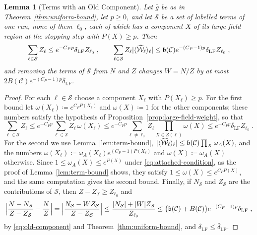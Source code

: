 \documentclass[11pt]{preprint}
\DeclarePairedDelimiter{\abs}{\lvert}{\rvert}
\numberwithin{equation}{section}
\newtheorem{lemma}[theorem]{Lemma}
\theoremstyle{definition}
\theoremstyle{remark}
\theoremstyle{plain}
\begin{document}
\begin{lemma}[Terms with an Old Component]\label{lem:old-component}
Let $\bar g$ be as in Theorem~\ref{thm:uniform-bound}, let $p \geq 0$, and let $\mathcal S$ be a set of labelled terms of one run, none of them $\ell_0$, each of which has a component $X$ of its large-field region at the stopping step with $P(X) \geq p$. Then
\begin{equation}\label{eq:old-component}
    \sum_{\ell \in \mathcal S}Z_\ell \leq e^{-C_Pp}\delta_{\mathrm{LF}}Z_{\ell_0}\;,
    \qquad
    \sum_{\ell \in \mathcal S}Z_\ell\abs{\langle\widehat{\mathcal W}_\ell\rangle_\ell} \leq \mathfrak b(\mathcal C)e^{-(C_P-1)p}\delta_{\mathrm{LF}}Z_{\ell_0}\;,
\end{equation}
and removing the terms of $\mathcal S$ from $N$ and $Z$ changes $W = N/Z$ by at most $2B(\mathcal C)e^{-(C_P-1)p}\bar\delta_{\mathrm{LF}}$.
\end{lemma}

\begin{proof}
For each $\ell \in \mathcal S$ choose a component $X_\ell$ with $P(X_\ell) \geq p$. For the first bound let $\omega(X_\ell) \coloneqq e^{C_PP(X_\ell)}$ and $\omega(X) \coloneqq 1$ for the other components; these numbers satisfy the hypothesis of Proposition~\ref{prop:large-field-weight}, so that
\begin{equation}\label{eq:old-component-proof}
    \sum_{\ell \in \mathcal S}Z_\ell \leq e^{-C_Pp}\sum_{\ell \in \mathcal S}Z_\ell\,\omega(X_\ell) \leq e^{-C_Pp}\sum_{\ell \neq \ell_0}Z_\ell\prod_{X \in Z(\ell)}\omega(X) \leq e^{-C_Pp}\delta_{\mathrm{LF}}Z_{\ell_0}\;.
\end{equation}
For the second we use Lemma~\ref{lem:term-bound}, $\abs{\langle\widehat{\mathcal W}_\ell\rangle_\ell} \leq \mathfrak b(\mathcal C)\prod_X\omega_A(X)$, and the numbers $\omega(X_\ell) \coloneqq \omega_A(X_\ell)e^{(C_P-1)P(X_\ell)}$ and $\omega(X) \coloneqq \omega_A(X)$ otherwise. Since $1 \leq \omega_A(X) \leq e^{P(X)}$ under \eqref{eq:attached-condition}, as the proof of Lemma~\ref{lem:term-bound} shows, they satisfy $1 \leq \omega(X) \leq e^{C_PP(X)}$, and the same computation gives the second bound. Finally, if $N_{\mathcal S}$ and $Z_{\mathcal S}$ are the contributions of $\mathcal S$, then $Z - Z_{\mathcal S} \geq Z_{\ell_0}$ and
\begin{equation}\label{eq:removal}
    \Bigl\lvert\frac{N - N_{\mathcal S}}{Z - Z_{\mathcal S}} - \frac{N}{Z}\Bigr\rvert = \Bigl\lvert\frac{N_{\mathcal S} - WZ_{\mathcal S}}{Z - Z_{\mathcal S}}\Bigr\rvert \leq \frac{\abs{N_{\mathcal S}} + \abs{W}Z_{\mathcal S}}{Z_{\ell_0}} \leq \bigl(\mathfrak b(\mathcal C) + B(\mathcal C)\bigr)e^{-(C_P-1)p}\delta_{\mathrm{LF}}\;,
\end{equation}
by \eqref{eq:old-component} and Theorem~\ref{thm:uniform-bound}, and $\delta_{\mathrm{LF}} \leq \bar\delta_{\mathrm{LF}}$.
\end{proof}
\end{document}
